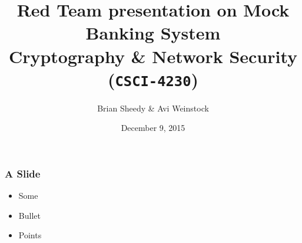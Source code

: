 \documentclass{beamer}
\title{Red Team presentation on Mock Banking System\\Cryptography \& Network Security (\Verb|CSCI-4230|)}
\date{December 9, 2015}
\author{Brian Sheedy \& Avi Weinstock}
\begin{document}
\maketitle

\begin{frame}[fragile]
\frametitle{A Slide}
\begin{itemize}
\item Some
\item Bullet
\item Points
\end{itemize}
\end{frame}
\end{document}
